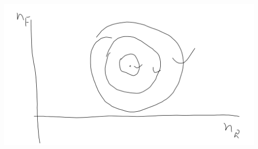 \documentclass[a4paper]{article}
\begin{document}
\includegraphics[scale=0.5]{image/Bio_14.png}

\end{document}
